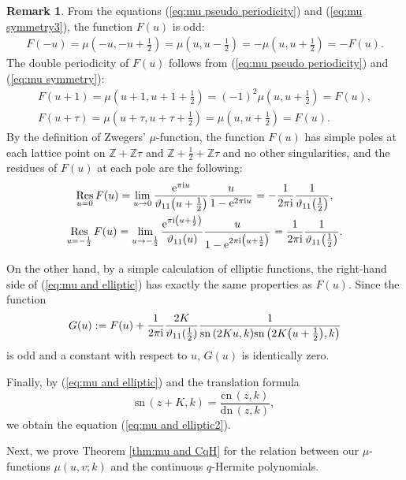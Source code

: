 \documentclass[pdftex]{sigma}
\numberwithin{equation}{section}
\theoremstyle{definition}
\newtheorem{rmk}[thm]{Remark}
\newcommand{\sn}{\mathrm{sn}\,}
\newcommand{\cn}{\mathrm{cn}\,}
\newcommand{\dn}{\mathrm{dn}\,}
\begin{document}
\begin{rmk}
From the equations (\ref{eq:mu pseudo periodicity}) and (\ref{eq:mu symmetry3}), the function $F(u)$ is odd:
\begin{gather*}
F(-u) =
 \mu \left(-u,-u+\frac{1}{2}\right)
 =
 \mu \left(u,u-\frac{1}{2}\right)
 =
 -\mu \left(u,u+\frac{1}{2}\right)
 =
 -F(u).
\end{gather*}
The double periodicity of $F(u)$ follows from (\ref{eq:mu pseudo periodicity}) and (\ref{eq:mu symmetry}):
\begin{gather*}
F(u+1)
 =
 \mu \left(u+1,u+1+\frac{1}{2}\right)
 =
 (-1)^{2}\mu \left(u,u+\frac{1}{2}\right)
 =
 F(u), \\
F(u+\tau )
 =
 \mu \left(u+\tau,u+\tau +\frac{1}{2}\right)
 =
 \mu \left(u,u+\frac{1}{2}\right)
 =
 F(u).
\end{gather*}
By the definition of Zwegers' $\mu$-function, the function $F(u)$ has simple poles at each lattice point on $\mathbb{Z}+\mathbb{Z}\tau $ and $\mathbb{Z}+\frac{1}{2}+\mathbb{Z}\tau $ and no other singularities, and the residues of $F(u)$ at each pole are the following:
\begin{gather*}
\mathop{\mathrm{Res}}_{u=0}F(u)
 =
 \lim_{u \to 0}\frac{{\rm e}^{\pi{\rm i}u}}{\vartheta _{11}\big(u+\frac{1}{2}\big)}\frac{u}{1-{\rm e}^{2\pi{\rm i}u}}
 =
 -\frac{1}{2\pi{\rm i}}\frac{1}{\vartheta _{11}\big(\frac{1}{2}\big)}, \\
\mathop{\mathrm{Res}}_{u=-\frac{1}{2}}F(u)
 =
 \lim_{u \to -\frac{1}{2}}\frac{{\rm e}^{\pi{\rm i}\left(u+\frac{1}{2}\right)}}{\vartheta _{11}(u)}\frac{u}{1-{\rm e}^{2\pi{\rm i}\big(u+\frac{1}{2}\big)}}
 =
 \frac{1}{2\pi{\rm i}}\frac{1}{\vartheta _{11}\big(\frac{1}{2}\big)}.
\end{gather*}

On the other hand, by a simple calculation of elliptic functions, the right-hand side of (\ref{eq:mu and elliptic}) has exactly the same properties as $F(u)$.
Since the function
\[
G(u):=F(u)+\frac{1}{2\pi{\rm i}}\frac{2K}{\vartheta _{11}(\frac{1}{2})}\frac{1}{\sn{(2Ku,k)}\sn{\big(2K\big(u+\frac{1}{2}\big),k\big)}}
\]
is odd and a constant with respect to $u$, $G(u)$ is identically zero.

Finally, by (\ref{eq:mu and elliptic}) and the translation formula
\[
\sn(z+K,k)=\frac{\cn(z,k)}{\dn(z,k)},
\]
we obtain the equation (\ref{eq:mu and elliptic2}).
\end{rmk}


Next, we prove Theorem \ref{thm:mu and CqH} for the relation between our $\mu$-functions $\mu(u,v;k)$ and the continuous $q$-Hermite polynomials.
\end{document}
